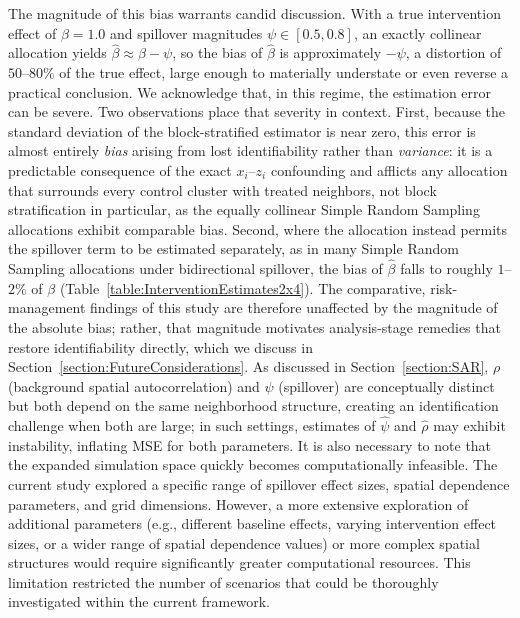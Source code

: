 \documentclass{article}[11pt]
\begin{document}
The magnitude of this bias warrants candid discussion. With a true intervention effect of $\beta = 1.0$ and spillover magnitudes $\psi \in [0.5, 0.8]$, an exactly collinear allocation yields $\hat{\beta} \approx \beta - \psi$, so the bias of $\hat{\beta}$ is approximately $-\psi$, a distortion of $50$--$80\%$ of the true effect, large enough to materially understate or even reverse a practical conclusion. We acknowledge that, in this regime, the estimation error can be severe. Two observations place that severity in context. First, because the standard deviation of the block-stratified estimator is near zero, this error is almost entirely \emph{bias} arising from lost identifiability rather than \emph{variance}: it is a predictable consequence of the exact $x_i$--$z_i$ confounding and afflicts any allocation that surrounds every control cluster with treated neighbors, not block stratification in particular, as the equally collinear Simple Random Sampling allocations exhibit comparable bias. Second, where the allocation instead permits the spillover term to be estimated separately, as in many Simple Random Sampling allocations under bidirectional spillover, the bias of $\hat{\beta}$ falls to roughly $1$--$2\%$ of $\beta$ (Table~\ref{table:InterventionEstimates2x4}). The comparative, risk-management findings of this study are therefore unaffected by the magnitude of the absolute bias; rather, that magnitude motivates analysis-stage remedies that restore identifiability directly, which we discuss in Section~\ref{section:FutureConsiderations}. As discussed in Section~\ref{section:SAR}, $\rho$ (background spatial autocorrelation) and $\psi$ (spillover) are conceptually distinct but both depend on the same neighborhood structure, creating an identification challenge when both are large; in such settings, estimates of $\hat{\psi}$ and $\hat{\rho}$ may exhibit instability, inflating MSE for both parameters. It is also necessary to note that the expanded simulation space quickly becomes computationally infeasible. The current study explored a specific range of spillover effect sizes, spatial dependence parameters, and grid dimensions. However, a more extensive exploration of additional parameters (e.g., different baseline effects, varying intervention effect sizes, or a wider range of spatial dependence values) or more complex spatial structures would require significantly greater computational resources. This limitation restricted the number of scenarios that could be thoroughly investigated within the current framework.
\end{document}

